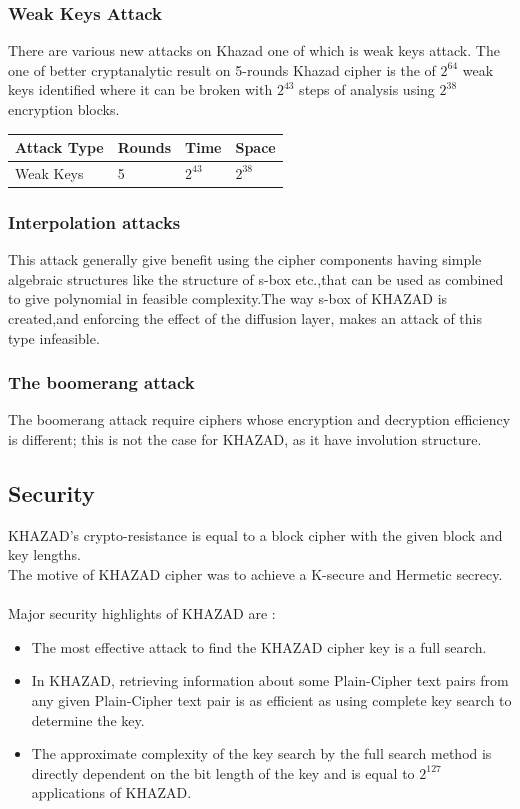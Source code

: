 \documentclass[preprint]{transcrypto}
\begin{document}
\subsubsection{Weak Keys Attack}\cite{2}
There are various new attacks on Khazad one of which is weak keys attack. The one of better cryptanalytic result on 5-rounds Khazad cipher is the of $2^{64}$ weak keys identified where it can be broken with
$2^{43}$ steps of analysis using $2^{38}$ encryption blocks.\\

\begin{table}[h]
\centering
\begin{tabular}{|l|l|l|l|}
\hline
Attack Type     & Rounds & Time     & Space \\ \hline
Weak Keys & 5      & $2^{43}$ & $2^{38}$ \\ \hline
\end{tabular}
\end{table}

\subsubsection{Interpolation attacks}\cite{2}
This attack generally give benefit using the cipher components having simple algebraic structures like the structure of s-box etc.,that can be used as combined to give
polynomial in feasible complexity.The way s-box of KHAZAD is created,and enforcing the effect of the diffusion
layer, makes an attack of this type infeasible.

\subsubsection{The boomerang attack}\cite{2}
The boomerang attack require ciphers whose encryption and decryption efficiency is different; this is not the case for KHAZAD, as it have
involution structure.

\subsection{Security}
KHAZAD's crypto-resistance is equal to a block cipher with the given block and key lengths. \\
The motive of KHAZAD cipher was to achieve a K-secure and Hermetic secrecy.\\\\
Major security highlights of KHAZAD are :
\begin{itemize}
    \item The most effective attack to find the KHAZAD cipher key is a full search.
    \item In KHAZAD, retrieving information about some Plain-Cipher text pairs from any given Plain-Cipher text pair is as efficient as using complete key search to determine the key.
    \item The approximate complexity of the key search by the full search method is directly dependent on the bit length of the key and is equal to $2^{127}$ applications of KHAZAD. \\
    
\end{itemize}
\end{document}
